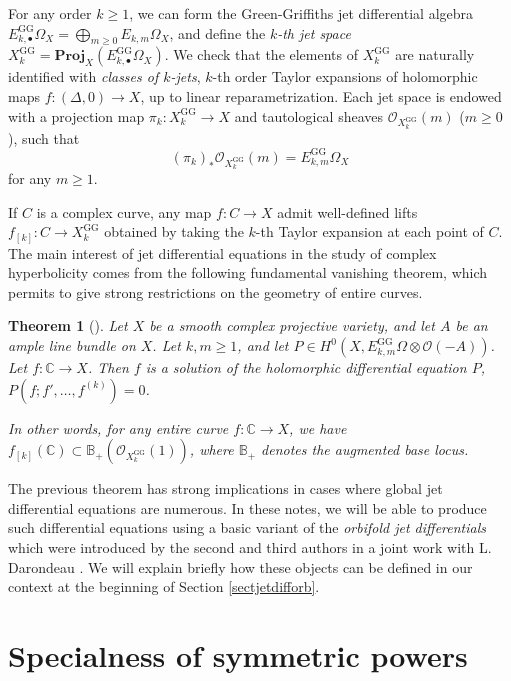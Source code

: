 \documentclass[JEP,XML,SOM,Unicode, NoEqCountersInSection,NoFloatCountersInSection,published]{cedram}
\let\mathcal\mathscr
\newcommand{\sbullet}{{\scriptscriptstyle\bullet}}
\newcommand{\rGG}{\mathrm{GG}}
\theoremstyle{theorem}
\newtheorem{theorem}{Theorem}
\theoremstyle{definition}
\begin{document}
For any order $k \geq 1$, we can form the Green-Griffiths jet differential algebra $E_{k, \sbullet}^{\rGG} \Omega_X = \bigoplus_{m \geq 0} E_{k, m} \Omega_X$, and define the \emph{$k$-th jet space} $X_{k}^{\rGG} = \mathbf{Proj}_X(E_{k, \sbullet}^{\rGG} \Omega_X)$. We check that the elements of $X_k^{\rGG}$ are naturally identified with \emph{classes of $k$-jets}, \ie $k$-th order Taylor expansions of holomorphic maps $f: (\Delta, 0) \to X$, up to linear reparametrization. Each jet space is endowed with a projection map $\pi_k : X_k^{\rGG} \to X$ and tautological sheaves $\mathcal O_{X_k^{\rGG}}(m)$ ($m \geq 0$), such that
\[
(\pi_k)_\ast \mathcal O_{X_k^{\rGG}}(m) = E_{k, m}^{\rGG} \Omega_X
\]
for any $m \geq 1$.

If $C$ is a complex curve, any map $f : C \to X$ admit well-defined lifts $f_{[k]} : C \to X_k^{\rGG}$ obtained by taking the $k$-th Taylor expansion at each point of $C$. The main interest of jet differential equations in the study of complex hyperbolicity comes from the following fundamental vanishing theorem, which permits to give strong restrictions on the geometry of entire curves.

\begin{theorem}[\cite{SY96, dem97}]
Let $X$ be a smooth complex projective variety, and let $A$ be an ample line bundle on $X$. Let $k, m \geq 1$, and let $P \in H^0(X, E_{k, m}^{\rGG} \Omega \otimes \mathcal O(-A))$. Let $f : \mathbb C \to X$. Then $f$ is a solution of the holomorphic differential equation $P$, \ie $P(f; f',\dots, f^{(k)}) = 0$.

In other words, for any entire curve $f : \mathbb C \to X$, we have $f_{[k]}(\mathbb C) \subset \mathbb{B}_+(\mathcal O_{X_k^{\rGG}}(1))$, where $\mathbb B_+$ denotes the augmented base locus.
\end{theorem}

The previous theorem has strong implications in cases where global jet differential equations are numerous. In these notes, we will be able to produce such differential equations using a basic variant of the \emph{orbifold jet differentials} which were introduced by the second and third authors in a joint work with L.\,Darondeau \cite{CDR18}. We will explain briefly how these objects can be defined in our context at the beginning of Section \ref{sectjetdifforb}.

\part{Specialness of symmetric powers}
\end{document}

